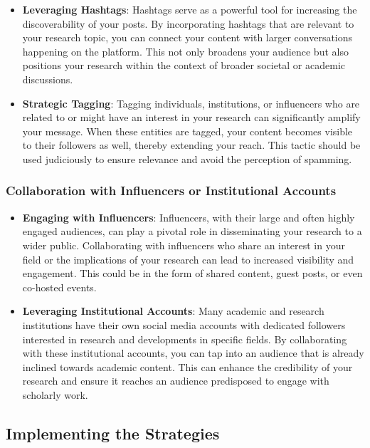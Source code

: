 \documentclass[
]{book}
\begin{document}
\begin{itemize}
\item
  \textbf{Leveraging Hashtags}: Hashtags serve as a powerful tool for increasing the discoverability of your posts. By incorporating hashtags that are relevant to your research topic, you can connect your content with larger conversations happening on the platform. This not only broadens your audience but also positions your research within the context of broader societal or academic discussions.
\item
  \textbf{Strategic Tagging}: Tagging individuals, institutions, or influencers who are related to or might have an interest in your research can significantly amplify your message. When these entities are tagged, your content becomes visible to their followers as well, thereby extending your reach. This tactic should be used judiciously to ensure relevance and avoid the perception of spamming.
\end{itemize}

\hypertarget{collaboration-with-influencers-or-institutional-accounts}{%
\subsubsection{Collaboration with Influencers or Institutional Accounts}\label{collaboration-with-influencers-or-institutional-accounts}}

\begin{itemize}
\item
  \textbf{Engaging with Influencers}: Influencers, with their large and often highly engaged audiences, can play a pivotal role in disseminating your research to a wider public. Collaborating with influencers who share an interest in your field or the implications of your research can lead to increased visibility and engagement. This could be in the form of shared content, guest posts, or even co-hosted events.
\item
  \textbf{Leveraging Institutional Accounts}: Many academic and research institutions have their own social media accounts with dedicated followers interested in research and developments in specific fields. By collaborating with these institutional accounts, you can tap into an audience that is already inclined towards academic content. This can enhance the credibility of your research and ensure it reaches an audience predisposed to engage with scholarly work.
\end{itemize}

\hypertarget{implementing-the-strategies}{%
\subsection{Implementing the Strategies}\label{implementing-the-strategies}}
\end{document}

